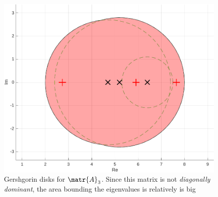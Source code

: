\begin{figure}
    \includegraphics[width=\textwidth]{problems/problem_7_3.pdf}
    \caption{Gershgorin disks for $\matr{A}_3$. Since this matrix is not \textit{diagonally dominant}, the area bounding the eigenvalues is relatively is big}
    \label{fig:problem_7_3}
\end{figure}




